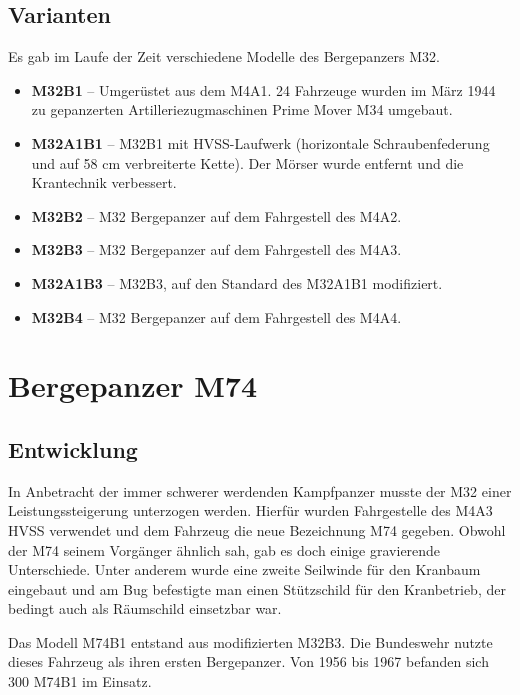 \documentclass[12pt,a4paper]{report}
\begin{document}
\pagebreak

\section{Varianten}
Es gab im Laufe der Zeit verschiedene Modelle des Bergepanzers M32.
\begin{itemize}
\item {\bf M32B1} – Umgerüstet aus dem M4A1. 24 Fahrzeuge wurden im März 1944 zu gepanzerten Artilleriezugmaschinen Prime Mover M34 umgebaut.
\item {\bf M32A1B1} – M32B1 mit HVSS-Laufwerk (horizontale Schraubenfederung und auf 58 cm verbreiterte Kette). Der Mörser wurde entfernt und die Krantechnik verbessert.
\item {\bf M32B2} – M32 Bergepanzer auf dem Fahrgestell des M4A2.
\item {\bf M32B3} – M32 Bergepanzer auf dem Fahrgestell des M4A3.
\item {\bf M32A1B3} – M32B3, auf den Standard des M32A1B1 modifiziert.
\item {\bf M32B4} – M32 Bergepanzer auf dem Fahrgestell des M4A4.
\end{itemize}

\chapter{Bergepanzer M74}
\section{Entwicklung}

\par
In Anbetracht der immer schwerer werdenden Kampfpanzer musste der M32 einer Leistungssteigerung unterzogen werden. Hierfür wurden Fahrgestelle des M4A3 HVSS verwendet und dem Fahrzeug die neue Bezeichnung M74 gegeben. Obwohl der M74 seinem Vorgänger ähnlich sah, gab es doch einige gravierende Unterschiede. Unter anderem wurde eine zweite Seilwinde für den Kranbaum eingebaut und am Bug befestigte man einen Stützschild für den Kranbetrieb, der bedingt auch als Räumschild einsetzbar war.
\par
Das Modell M74B1 entstand aus modifizierten M32B3. Die Bundeswehr nutzte dieses Fahrzeug als ihren ersten Bergepanzer. Von 1956 bis 1967 befanden sich 300 M74B1 im Einsatz.
\end{document}
